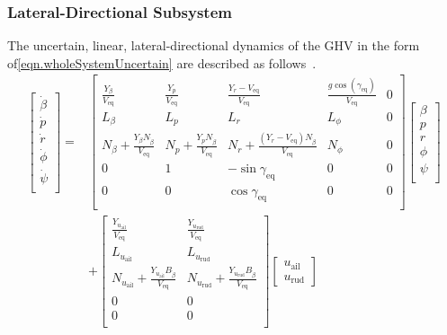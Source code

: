 \subsubsection{Lateral-Directional Subsystem}

The uncertain, linear, lateral-directional dynamics of the GHV in the form of\eqref{eqn.wholeSystemUncertain} are described as follows\ \cite{stengel.flightdynamics.2004}.
\begin{equation}
  \label{eqn.lateralDirectionalDynamics}
  \begin{split}
    \begin{bmatrix}
      \dot{\beta} \\
      \dot{p} \\
      \dot{r} \\
      \dot{\phi} \\
      \dot{\psi} \\
    \end{bmatrix}
    =&
    \begin{bmatrix}
      \frac{Y_{\beta}}{V_{\text{eq}}} & \frac{Y_{p}}{V_{\text{eq}}} & \frac{Y_{r}-V_{\text{eq}}}{V_{\text{eq}}} & \frac{g\cos(\gamma_{\text{eq}})}{V_{\text{eq}}} & 0 \\
      L_{\beta} & L_{p} & L_{r} & L_{\phi} & 0 \\
      N_{\beta}+\frac{Y_{\beta}N_{\dot{\beta}}}{V_{\text{eq}}} & N_{p}+\frac{Y_{p}N_{\dot{\beta}}}{V_{\text{eq}}} & N_{r}+\frac{(Y_{r}-V_{\text{eq}})N_{\dot{\beta}}}{V_{\text{eq}}} & N_{\phi} & 0 \\
      0 & 1 & -\sin\gamma_{\text{eq}} & 0 & 0 \\
      0 & 0 & \cos\gamma_{\text{eq}} & 0 & 0 \\
    \end{bmatrix}
    \begin{bmatrix}
      \beta \\
      p \\
      r \\
      \phi \\
      \psi \\
    \end{bmatrix} \\
    &+
    \begin{bmatrix}
      \frac{Y_{u_{\text{ail}}}}{V_{\text{eq}}} & \frac{Y_{u_{\text{rud}}}}{V_{\text{eq}}} \\
      L_{u_{\text{ail}}} & L_{u_{\text{rud}}} \\
      N_{u_{\text{ail}}}+\frac{Y_{u_{\text{ail}}}B_{\dot{\beta}}}{V_{\text{eq}}} & N_{u_{\text{rud}}}+\frac{Y_{u_{\text{rud}}}B_{\dot{\beta}}}{V_{\text{eq}}} \\
      0 & 0 \\
      0 & 0 \\
    \end{bmatrix}
    \begin{bmatrix}
      u_{\text{ail}} \\
      u_{\text{rud}}
    \end{bmatrix}
  \end{split}
\end{equation}

